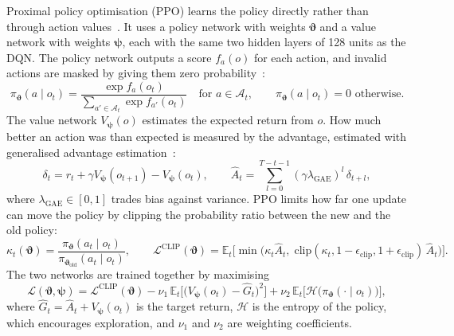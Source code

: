Proximal policy optimisation (PPO) learns the policy directly rather than through action values~\cite{schulman2017}. It uses a policy network with weights $\boldsymbol{\vartheta}$ and a value network with weights $\boldsymbol{\psi}$, each with the same two hidden layers of 128 units as the DQN. The policy network outputs a score $f_a(o)$ for each action, and invalid actions are masked by giving them zero probability~\cite{huang2022}:
\begin{equation}
\pi_{\boldsymbol{\vartheta}}(a \mid o_t) = \frac{\exp f_a(o_t)}{\sum_{a' \in \mathcal{A}_t} \exp f_{a'}(o_t)} \quad \text{for } a \in \mathcal{A}_t, \qquad \pi_{\boldsymbol{\vartheta}}(a \mid o_t) = 0 \text{ otherwise}.
\end{equation}
The value network $V_{\boldsymbol{\psi}}(o)$ estimates the expected return from $o$. How much better an action was than expected is measured by the advantage, estimated with generalised advantage estimation~\cite{schulman2016}:
\begin{equation}
\delta_t = r_t + \gamma V_{\boldsymbol{\psi}}(o_{t+1}) - V_{\boldsymbol{\psi}}(o_t), \qquad
\hat{A}_t = \sum_{l=0}^{T-t-1} (\gamma \lambda_{\text{GAE}})^{l}\, \delta_{t+l},
\end{equation}
where $\lambda_{\text{GAE}} \in [0, 1]$ trades bias against variance. PPO limits how far one update can move the policy by clipping the probability ratio between the new and the old policy:
\begin{equation}
\kappa_t(\boldsymbol{\vartheta}) = \frac{\pi_{\boldsymbol{\vartheta}}(a_t \mid o_t)}{\pi_{\boldsymbol{\vartheta}_{\text{old}}}(a_t \mid o_t)}, \qquad
\mathcal{L}^{\text{CLIP}}(\boldsymbol{\vartheta}) = \mathbb{E}_t\Big[ \min\big( \kappa_t \hat{A}_t,\; \text{clip}(\kappa_t, 1 - \epsilon_{\text{clip}}, 1 + \epsilon_{\text{clip}})\, \hat{A}_t \big) \Big].
\end{equation}
The two networks are trained together by maximising
\begin{equation}
\mathcal{L}(\boldsymbol{\vartheta}, \boldsymbol{\psi}) = \mathcal{L}^{\text{CLIP}}(\boldsymbol{\vartheta}) - \nu_1\, \mathbb{E}_t\Big[ \big( V_{\boldsymbol{\psi}}(o_t) - \hat{G}_t \big)^{2} \Big] + \nu_2\, \mathbb{E}_t\Big[ \mathcal{H}\big(\pi_{\boldsymbol{\vartheta}}(\cdot \mid o_t)\big) \Big],
\end{equation}
where $\hat{G}_t = \hat{A}_t + V_{\boldsymbol{\psi}}(o_t)$ is the target return, $\mathcal{H}$ is the entropy of the policy, which encourages exploration, and $\nu_1$ and $\nu_2$ are weighting coefficients.

